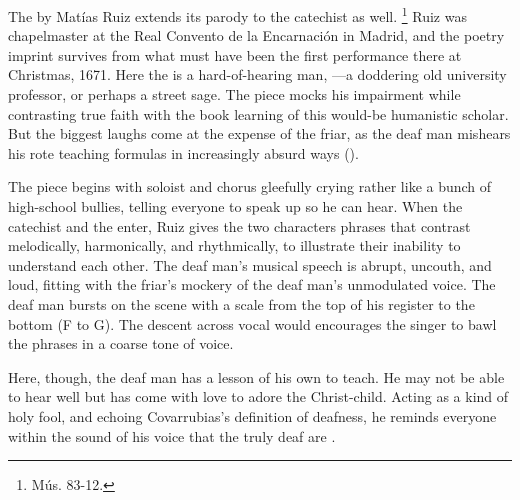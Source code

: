 The  by Matías Ruiz extends its parody to the catechist as well.%
  \footnote{\signature{E-E}{Mús. 83-12}.}
Ruiz was chapelmaster at the Real Convento de la Encarnación in Madrid, and the poetry imprint survives from what must have been the first performance there at Christmas, 1671.%
  \autocite{1671-Madrid-Enc-Nav}
Here the  is a hard-of-hearing man, ---a doddering old university professor, or perhaps a street sage.
The piece mocks his impairment while contrasting true faith with the book learning of this would-be humanistic scholar.
But the biggest laughs come at the expense of the friar, as the deaf man mishears his rote teaching formulas in increasingly absurd ways ().


The piece begins with soloist and chorus gleefully crying   rather like a bunch of high-school bullies, telling everyone to speak up so he can hear.
When the catechist and the  enter, Ruiz gives the two characters phrases that contrast melodically, harmonically, and rhythmically, to illustrate their inability to understand each other.
The deaf man's musical speech is abrupt, uncouth, and loud, fitting with the friar's mockery of the deaf man's unmodulated voice.
The deaf man bursts on the scene with a scale from the top of his register to the bottom (F to G).
The descent across vocal  would encourages the singer to bawl the phrases in a coarse tone of voice.



Here, though, the deaf man has a lesson of his own to teach.
He may not be able to hear well but has come with love to adore the Christ-child. 
Acting as a kind of holy fool, and echoing Covarrubias's definition of deafness, he reminds everyone within the sound of his voice that the truly deaf are .

